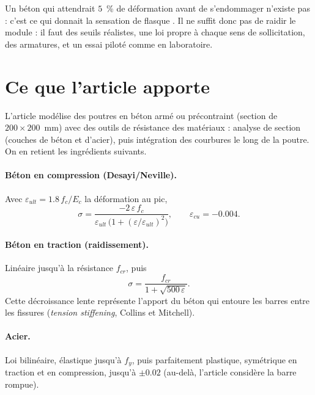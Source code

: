 \documentclass[11pt,a4paper]{article}
\begin{document}
Un béton qui attendrait $5$~\% de déformation avant de s'endommager n'existe pas : c'est ce qui
donnait la sensation de \og flasque \fg{}. Il ne suffit donc pas de raidir le module : il faut des
seuils réalistes, une loi propre à chaque sens de sollicitation, des armatures, et un essai
piloté comme en laboratoire.

\section{Ce que l'article apporte}

L'article modélise des poutres en béton armé ou précontraint (section de $200\times200$~mm) avec
des outils de résistance des matériaux : analyse de section (couches de béton et d'acier), puis
intégration des courbures le long de la poutre. On en retient les ingrédients suivants.

\paragraph{Béton en compression (Desayi/Neville).} Avec $\varepsilon_{ult} = 1.8\,f_c/E_c$ la
déformation au pic,
\begin{equation}
  \sigma = \frac{-2\,\varepsilon\, f_c}{\varepsilon_{ult}\,\big(1 + (\varepsilon/\varepsilon_{ult})^2\big)},
  \qquad \varepsilon_{cu} = -0.004 .
  \label{eq:desayi}
\end{equation}

\paragraph{Béton en traction (raidissement).} Linéaire jusqu'à la résistance $f_{cr}$, puis
\begin{equation}
  \sigma = \frac{f_{cr}}{1 + \sqrt{500\,\varepsilon}} .
  \label{eq:tension}
\end{equation}
Cette décroissance lente représente l'apport du béton qui entoure les barres entre les
fissures (\emph{tension stiffening}, Collins et Mitchell).

\paragraph{Acier.} Loi bilinéaire, élastique jusqu'à $f_y$, puis parfaitement plastique, symétrique
en traction et en compression, jusqu'à $\pm0.02$ (au-delà, l'article considère la barre rompue).
\end{document}
